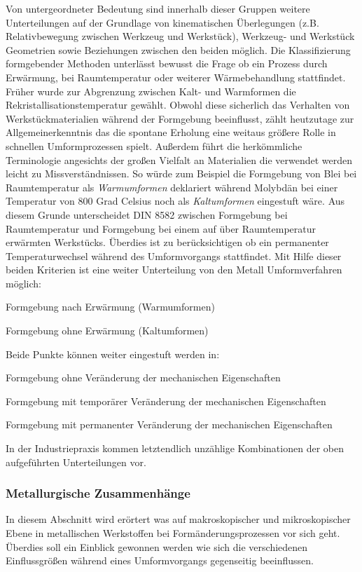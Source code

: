 \documentclass[12pt,a4paper,parskip,twoside,BCOR5mm,headsepline]{scrartcl}
\begin{document}
\begin{description*}
{Von untergeordneter Bedeutung sind innerhalb dieser Gruppen  weitere Unterteilungen auf der Grundlage von kinematischen Überlegungen (z.B. Relativbewegung zwischen Werkzeug und Werkstück), Werkzeug- und Werkstück Geometrien sowie Beziehungen zwischen den beiden möglich. Die Klassifizierung formgebender Methoden unterlässt bewusst die Frage ob ein Prozess durch Erwärmung, bei Raumtemperatur oder weiterer Wärmebehandlung stattfindet. Früher  wurde zur Abgrenzung zwischen Kalt- und Warmformen die Rekristallisationstemperatur gewählt. Obwohl diese sicherlich das Verhalten  von Werkstückmaterialien während der Formgebung beeinflusst, zählt heutzutage zur Allgemeinerkenntnis das die spontane Erholung  eine weitaus größere Rolle in schnellen Umformprozessen spielt. Außerdem führt die herkömmliche Terminologie angesichts der großen Vielfalt  an Materialien die verwendet werden leicht zu Missverständnissen. So würde zum Beispiel die Formgebung von Blei bei Raumtemperatur als \emph{Warmumformen} deklariert während Molybdän bei einer Temperatur von 800 Grad Celsius noch als \emph{Kaltumformen} eingestuft wäre. Aus diesem Grunde unterscheidet DIN 8582 zwischen Formgebung bei Raumtemperatur und Formgebung bei einem auf über Raumtemperatur erwärmten Werkstücks. Überdies ist zu berücksichtigen ob ein permanenter Temperaturwechsel während des Umformvorgangs stattfindet. Mit Hilfe dieser beiden Kriterien ist eine weiter Unterteilung von den Metall Umformverfahren möglich:

\begin{enumerate*}
\item Formgebung nach Erwärmung (Warmumformen)
\item Formgebung ohne Erwärmung (Kaltumformen)
\end{enumerate*}

Beide Punkte können weiter eingestuft werden in:

\begin{itemize*}
\item Formgebung ohne Veränderung der mechanischen Eigenschaften
\item Formgebung mit temporärer Veränderung der mechanischen Eigenschaften
\item Formgebung mit permanenter Veränderung der mechanischen Eigenschaften
\end{itemize*}

In der Industriepraxis kommen letztendlich unzählige Kombinationen der oben aufgeführten Unterteilungen vor. \autocite[2.1ff]{kl}
\subsubsection{Metallurgische Zusammenhänge}
In diesem Abschnitt wird erörtert was auf makroskopischer und mikroskopischer Ebene in metallischen Werkstoffen bei Formänderungsprozessen vor sich geht. Überdies soll ein Einblick gewonnen werden wie sich die verschiedenen Einflussgrößen während eines Umformvorgangs gegenseitig beeinflussen.


}
\end{description*}
\end{document}
